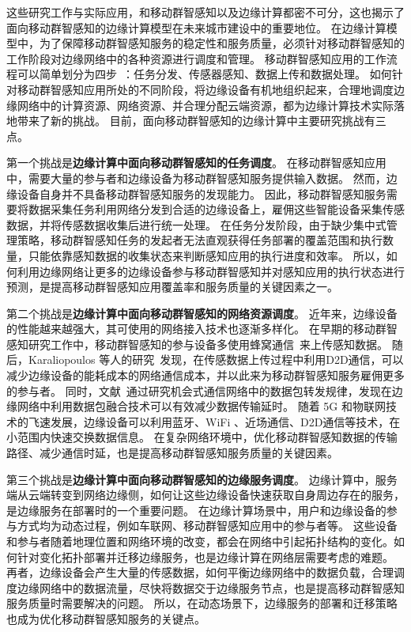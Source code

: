 这些研究工作与实际应用，和移动群智感知以及边缘计算都密不可分，这也揭示了面向移动群智感知的边缘计算模型在未来城市建设中的重要地位。
在边缘计算模型中，为了保障移动群智感知服务的稳定性和服务质量，必须针对移动群智感知的工作阶段对边缘网络中的各种资源进行调度和管理。
移动群智感知应用的工作流程可以简单划分为四步~\cite{zh_cn:shi}：任务分发、传感器感知、数据上传和数据处理。
如何针对移动群智感知应用所处的不同阶段，将边缘设备有机地组织起来，合理地调度边缘网络中的计算资源、网络资源、并合理分配云端资源，都为边缘计算技术实际落地带来了新的挑战。
目前，面向移动群智感知的边缘计算中主要研究挑战有三点。

第一个挑战是\textbf{边缘计算中面向移动群智感知的任务调度}。
在移动群智感知应用中，需要大量的参与者和边缘设备为移动群智感知服务提供输入数据。
然而，边缘设备自身并不具备移动群智感知服务的发现能力。
因此，移动群智感知服务需要将数据采集任务利用网络分发到合适的边缘设备上，雇佣这些智能设备采集传感数据，并将传感数据收集后进行统一处理。
在任务分发阶段，由于缺少集中式管理策略，移动群智感知任务的发起者无法直观获得任务部署的覆盖范围和执行数量，只能依靠感知数据的收集状态来判断感知应用的执行进度和效率。
所以，如何利用边缘网络让更多的边缘设备参与移动群智感知并对感知应用的执行状态进行预测，是提高移动群智感知应用覆盖率和服务质量的关键因素之一。

第二个挑战是\textbf{边缘计算中面向移动群智感知的网络资源调度}。
近年来，边缘设备的性能越来越强大，其可使用的网络接入技术也逐渐多样化。
在早期的移动群智感知研究工作中，移动群智感知的参与设备多使用蜂窝通信~\cite{DBLP:conf/globecom/ZhangJLLC16,DBLP:conf/icdcs/XiaoWHHH16}来上传感知数据。
随后，Karaliopoulos 等人的研究~\cite{DBLP:conf/infocom/KaraliopoulosTK15}发现，在传感数据上传过程中利用D2D通信，可以减少边缘设备的能耗成本的网络通信成本，并以此来为移动群智感知服务雇佣更多的参与者。
同时，文献~通过研究机会式通信网络中的数据包转发规律，发现在边缘网络中利用数据包融合技术可以有效减少数据传输延时。
随着 5G 和物联网技术的飞速发展，边缘设备可以利用蓝牙、WiFi 、近场通信、D2D通信等技术，在小范围内快速交换数据信息。
在复杂网络环境中，优化移动群智感知数据的传输路径、减少通信时延，也是提高移动群智感知服务质量的关键因素。

第三个挑战是\textbf{边缘计算中面向移动群智感知的边缘服务调度}。
边缘计算中，服务端从云端转变到网络边缘侧，如何让这些边缘设备快速获取自身周边存在的服务，是边缘服务在部署时的一个重要问题。
在边缘计算场景中，用户和边缘设备的参与方式均为动态过程，例如车联网、移动群智感知应用中的参与者等。
这些设备和参与者随着地理位置和网络环境的改变，都会在网络中引起拓扑结构的变化。如何针对变化拓扑部署并迁移边缘服务，也是边缘计算在网络层需要考虑的难题。
再者，边缘设备会产生大量的传感数据，如何平衡边缘网络中的数据负载，合理调度边缘网络中的数据流量，尽快将数据交于边缘服务节点，也是提高移动群智感知服务质量时需要解决的问题。
所以，在动态场景下，边缘服务的部署和迁移策略也成为优化移动群智感知服务的关键点。



